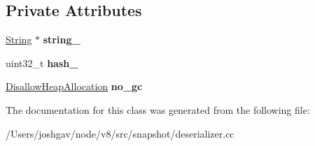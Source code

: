 \subsection*{Private Attributes}
\begin{DoxyCompactItemize}
\item 
\hyperlink{classv8_1_1internal_1_1_string}{String} $\ast$ {\bfseries string\+\_\+}\hypertarget{classv8_1_1internal_1_1_string_table_insertion_key_a1668153ba231ce255889e0ba8393b73d}{}\label{classv8_1_1internal_1_1_string_table_insertion_key_a1668153ba231ce255889e0ba8393b73d}

\item 
uint32\+\_\+t {\bfseries hash\+\_\+}\hypertarget{classv8_1_1internal_1_1_string_table_insertion_key_ae2c0ab84c09b4126990a83da8495a8a6}{}\label{classv8_1_1internal_1_1_string_table_insertion_key_ae2c0ab84c09b4126990a83da8495a8a6}

\item 
\hyperlink{classv8_1_1internal_1_1_per_thread_assert_scope_debug_only}{Disallow\+Heap\+Allocation} {\bfseries no\+\_\+gc}\hypertarget{classv8_1_1internal_1_1_string_table_insertion_key_aa998c87ea9d4836a4b798ab212992d8f}{}\label{classv8_1_1internal_1_1_string_table_insertion_key_aa998c87ea9d4836a4b798ab212992d8f}

\end{DoxyCompactItemize}


The documentation for this class was generated from the following file\+:\begin{DoxyCompactItemize}
\item 
/\+Users/joshgav/node/v8/src/snapshot/deserializer.\+cc\end{DoxyCompactItemize}
